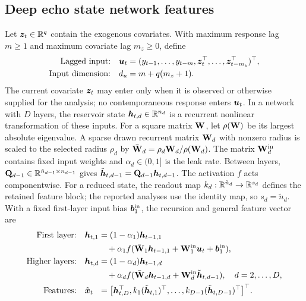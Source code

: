 \subsection{Deep echo state network features}
\label{qdesn2026:subsec:desn-features}

Let \(\boldsymbol{z}_t\in\mathbb{R}^q\) contain the exogenous covariates. With maximum
response lag \(m\geq1\) and maximum covariate lag \(m_z\geq0\), define
\begin{equation}
\begin{aligned}
\text{Lagged input:}\quad
\boldsymbol{u}_t&=(y_{t-1},\ldots,y_{t-m},
\boldsymbol{z}_t^\top,\ldots,\boldsymbol{z}_{t-m_z}^\top)^\top,\\
\text{Input dimension:}\quad d_u&=m+q(m_z+1).
\end{aligned}
\label{qdesn2026:eq:desn-input-main}
\end{equation}
The current covariate \(\boldsymbol{z}_t\) may enter only when it is observed or
otherwise supplied for the analysis; no contemporaneous response enters
\(\boldsymbol{u}_t\). In a network with \(D\) layers, the reservoir state
\(\boldsymbol{h}_{t,d}\in\mathbb{R}^{n_d}\) is a recurrent nonlinear transformation of
these inputs. For a square matrix \(\mathbf{W}\), let \(\rho(\mathbf{W})\) be its
largest absolute eigenvalue. A sparse drawn recurrent matrix \(\mathbf{W}_d\)
with nonzero radius is scaled to the selected radius \(\rho_d\) by
\(\bar{\mathbf{W}}_d=\rho_d\mathbf{W}_d/\rho(\mathbf{W}_d)\).
The matrix \(\mathbf{W}_d^{\mathrm{in}}\) contains fixed input weights and
\(\alpha_d\in(0,1]\) is the leak rate. Between layers,
\(\mathbf{Q}_{d-1}\in\mathbb{R}^{\tilde n_{d-1}\times n_{d-1}}\) gives
\(\tilde{\boldsymbol{h}}_{t,d-1}=\mathbf{Q}_{d-1}\boldsymbol{h}_{t,d-1}\).
The activation \(f\) acts componentwise. For a reduced state, the readout map
\(k_d:\mathbb{R}^{\tilde n_d}\to\mathbb{R}^{s_d}\) defines the retained feature block; the
reported analyses use the identity map, so \(s_d=\tilde n_d\).
With a fixed first-layer input bias \(\boldsymbol{b}_1^{\mathrm{in}}\), the
recursion and general feature vector are
\begin{equation}
\begin{alignedat}{2}
\text{First layer:}\quad &\boldsymbol{h}_{t,1}
&&=(1-\alpha_1)\boldsymbol{h}_{t-1,1}\\
&&&\quad+\alpha_1 f(\bar{\mathbf{W}}_1\boldsymbol{h}_{t-1,1}
+\mathbf{W}_1^{\mathrm{in}}\boldsymbol{u}_t+\boldsymbol{b}_1^{\mathrm{in}}),\\
\text{Higher layers:}\quad &\boldsymbol{h}_{t,d}
&&=(1-\alpha_d)\boldsymbol{h}_{t-1,d}\\
&&&\quad+\alpha_d f(\bar{\mathbf{W}}_d\boldsymbol{h}_{t-1,d}
+\mathbf{W}_d^{\mathrm{in}}\tilde{\boldsymbol{h}}_{t,d-1}),\quad d=2,\ldots,D,\\
\text{Features:}\quad &\tilde{\boldsymbol{x}}_t
&&=\big[\boldsymbol{h}_{t,D}^\top,k_1(\tilde{\boldsymbol{h}}_{t,1})^\top,\ldots,
k_{D-1}(\tilde{\boldsymbol{h}}_{t,D-1})^\top\big]^\top.
\end{alignedat}
\label{qdesn2026:eq:desn-hierarchy}
\end{equation}
